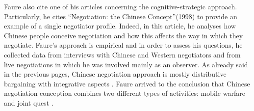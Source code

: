 \documentclass[../main.tex]{subfiles}
\begin{document}
\begin{minipage}{\linewidth}%
    \label{faureTable}
\end{minipage}

\pagebreak
Faure also cite one of his articles concerning the cognitive-strategic approach. Particularly, he cites “Negotiation: the Chinese Concept”(1998) to provide an example of a single negotiator profile. Indeed, in this article, he analyses how Chinese people conceive negotiation and how this affects the way in which they negotiate. Faure's approach is empirical and in order to assess his questions, he collected data from interviews with Chinese and Western negotiators and from live negotiations in which he was involved mainly as an observer. As already said in the previous pages, Chinese negotiation approach is mostly distributive bargaining with integrative aspects \autocite[12]{stripp}. Faure arrived to the conclusion that Chinese negotiation conception combines two different types of activities: mobile warfare and joint quest \autocite[140]{faure1}.
\end{document}
